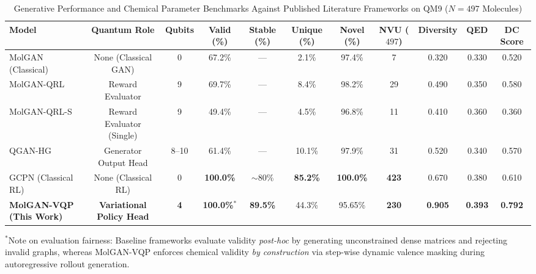\documentclass[conference]{IEEEtran}
\begin{document}
\begin{table}[t]
\centering
\scriptsize
\caption{Generative Performance and Chemical Parameter Benchmarks Against Published Literature Frameworks on QM9 ($N = 497$ Molecules)}
\label{tab:benchmark}
\setlength{\tabcolsep}{2.5pt}
\begin{tabular*}{\textwidth}{@{\extracolsep{\fill}}lcccccccccc}
\toprule
\textbf{Model} & \textbf{Quantum Role} & \textbf{Qubits} & \textbf{Valid (\%)} & \textbf{Stable (\%)} & \textbf{Unique (\%)} & \textbf{Novel (\%)} & \textbf{NVU ($497$)} & \textbf{Diversity} & \textbf{QED} & \textbf{DC Score} \\
\midrule
MolGAN (Classical) \cite{decao2018molgan} & None (Classical GAN) & 0 & 67.2\% & --- & 2.1\% & 97.4\% & 7 & 0.320 & 0.330 & 0.520 \\
MolGAN-QRL \cite{hergli2026} & Reward Evaluator & 9 & 69.7\% & --- & 8.4\% & 98.2\% & 29 & 0.490 & 0.350 & 0.580 \\
MolGAN-QRL-S \cite{hergli2026} & Reward Evaluator (Single) & 9 & 49.4\% & --- & 4.5\% & 96.8\% & 11 & 0.410 & 0.360 & 0.360 \\
QGAN-HG \cite{hergli2026} & Generator Output Head & 8--10 & 61.4\% & --- & 10.1\% & 97.9\% & 31 & 0.520 & 0.340 & 0.570 \\
GCPN (Classical RL) \cite{you2018graph} & None (Classical RL) & 0 & \textbf{100.0\%} & $\sim 80\%$ & \textbf{85.2\%} & \textbf{100.0\%} & \textbf{423} & 0.670 & 0.380 & 0.610 \\
\midrule
\textbf{MolGAN-VQP (This Work)} & \textbf{Variational Policy Head} & \textbf{4} & \textbf{100.0\%}$^*$ & \textbf{89.5\%} & 44.3\% & 95.65\% & \textbf{230} & \textbf{0.905} & \textbf{0.393} & \textbf{0.792} \\
\bottomrule
\end{tabular*}
\vspace{1ex}
\raggedright \scriptsize $^*$Note on evaluation fairness: Baseline frameworks evaluate validity \textit{post-hoc} by generating unconstrained dense matrices and rejecting invalid graphs, whereas MolGAN-VQP enforces chemical validity \textit{by construction} via step-wise dynamic valence masking during autoregressive rollout generation.
\end{table}
\end{document}
